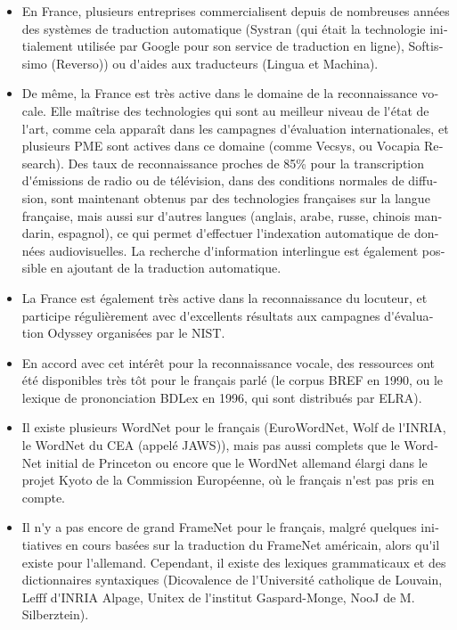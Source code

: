 \begin{french}
\begin{multicols}{2}
\begin{itemize}
\item En France, plusieurs entreprises commercialisent depuis de nombreuses
années des systèmes de traduction automatique (Systran (qui était la
technologie initialement utilisée par Google pour son service de
traduction en ligne), Softissimo (Reverso)) ou d{\mbox '}aides aux traducteurs
(Lingua et Machina).

\item De même, la France est très active dans le domaine de la
reconnaissance vocale. Elle maîtrise des technologies qui sont au
meilleur niveau de l{\mbox '}état de l{\mbox '}art, comme cela apparaît dans les
campagnes d{\mbox '}évaluation internationales, et plusieurs PME sont actives
dans ce domaine (comme Vecsys, ou Vocapia Research). Des taux de
reconnaissance proches de 85\% pour la transcription d{\mbox '}émissions de
radio ou de télévision, dans des conditions normales de diffusion,
sont maintenant obtenus par des technologies françaises sur la langue
française, mais aussi sur d{\mbox '}autres langues (anglais, arabe, russe,
chinois mandarin, espagnol), ce qui permet d{\mbox '}effectuer l{\mbox '}indexation automatique
de données audiovisuelles. La recherche d{\mbox '}information interlingue est
également possible en ajoutant de la traduction automatique.

\item La France est également très active dans la reconnaissance du
locuteur, et participe régulièrement avec d{\mbox '}excellents résultats aux
campagnes d{\mbox '}évaluation Odyssey organisées par le NIST.

\item En accord avec cet intérêt pour la reconnaissance vocale, des
ressources ont été disponibles très tôt pour le français parlé (le
corpus BREF en 1990, ou le lexique de prononciation BDLex en 1996, qui
sont distribués par ELRA).

\item Il existe plusieurs WordNet pour le français (EuroWordNet, Wolf
  de l{\mbox '}INRIA, le WordNet du CEA (appelé JAWS)), mais pas aussi
  complets que le WordNet initial de Princeton ou encore que le
  WordNet allemand élargi dans le projet Kyoto de la Commission
  Européenne, où le français n{\mbox '}est pas pris en compte.

\item Il n{\mbox '}y a pas encore de grand FrameNet pour le français, malgré
quelques initiatives en cours basées sur la traduction du FrameNet
américain, alors qu{\mbox '}il existe pour l{\mbox '}allemand. Cependant, il existe
des lexiques grammaticaux et des dictionnaires syntaxiques
(Dicovalence de l{\mbox '}Université catholique de Louvain, Lefff d{\mbox '}INRIA
Alpage, Unitex de l{\mbox '}institut Gaspard-Monge, NooJ de M. Silberztein).


\end{itemize}
\end{multicols}
\end{french}
